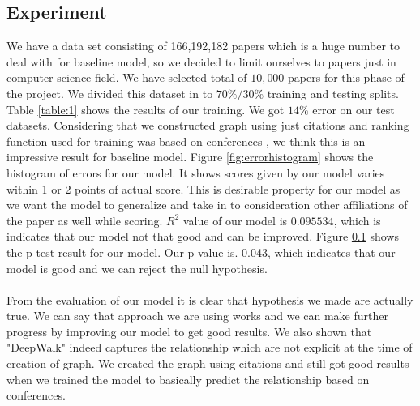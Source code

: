 \documentclass[a4paper, 11pt]{article}
\begin{document}
\subsection{Experiment}
We have a data set consisting of 166,192,182 papers which is a huge number to deal with for baseline model, so we decided to limit ourselves to papers just in computer science field. We have selected total of $10,000$ papers for this phase of the project. We divided this dataset in to $70\%/30\% $ training and testing splits. Table \ref{table:1} shows the results of our training. We got $14\%$ error on our test datasets. Considering that we constructed graph using just citations and ranking function used for training was based on conferences , we think this is an impressive result for baseline model. Figure \ref{fig:errorhistogram} shows the histogram of errors for our model. It shows scores given by our model varies within 1 or 2 points of actual score. This is desirable property for our model as we want the model to generalize and take in to consideration other affiliations of the paper as well while scoring. $R^2$ value of our model is $0.095534$, which is indicates that our model not that good and can be improved. Figure \ref{} shows the p-test result for our model. Our p-value is. 0.043, which indicates that our model is good and we can reject the null hypothesis.  \\
\\From the evaluation of our model it is clear that hypothesis we made are actually true. We can say that approach we are using works and we can make further progress by improving our model to get good results. We also shown that "DeepWalk" indeed captures the relationship which are not explicit at the time of creation of graph. We created the graph using citations and still got good results when we trained the model to basically predict the relationship based on conferences. 
\end{document}

